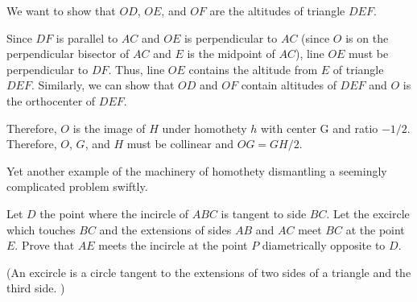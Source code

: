 


We want to show that $OD$, $OE$, and $OF$ are the altitudes of triangle $DEF$.



Since $DF$ is parallel to $AC$ and $OE$ is perpendicular to $AC$ (since $O$ is on the perpendicular bisector of $AC$ and $E$ is the midpoint of $AC$), line $OE$ must be perpendicular to $DF$. Thus, line $OE$ contains the altitude from $E$ of triangle $DEF$. Similarly, we can show that $OD$ and $OF$ contain altitudes of $DEF$ and $O$ is the orthocenter of $DEF$.

Therefore, $O$ is the image of $H$ under homothety $h$ with center G and ratio $-1/2$. Therefore, $O$, $G$, and $H$ must be collinear and $OG = GH/2$.

Yet another example of the machinery of homothety dismantling a seemingly complicated problem swiftly.

Let $D$ the point where the incircle of $ABC$ is tangent to side $BC. $ Let the excircle which touches $BC$ and the extensions of sides $AB$ and $AC$ meet $BC$ at the point $E.$ Prove that $AE$ meets the incircle at the point $P$ diametrically opposite to $D.$

(An excircle is a circle tangent to the extensions of two sides of a triangle and the third side. )





